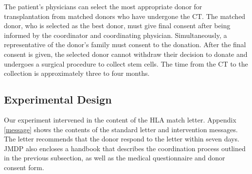 \documentclass[12pt, a4paper]{article}
\begin{document}
The patient's physicians can select the most appropriate donor for transplantation from matched donors who have undergone the CT. The matched donor, who is selected as the best donor, must give final consent after being informed by the coordinator and coordinating physician. Simultaneously, a representative of the donor's family must consent to the donation. After the final consent is given, the selected donor cannot withdraw their decision to donate and undergoes a surgical procedure to collect stem cells. The time from the CT to the collection is approximately three to four months.

\hypertarget{design}{%
\subsection{Experimental Design}\label{design}}

Our experiment intervened in the content of the HLA match letter. Appendix \ref{message} shows the contents of the standard letter and intervention messages. The letter recommends that the donor respond to the letter within seven days. JMDP also encloses a handbook that describes the coordination process outlined in the previous subsection, as well as the medical questionnaire and donor consent form.
\end{document}

